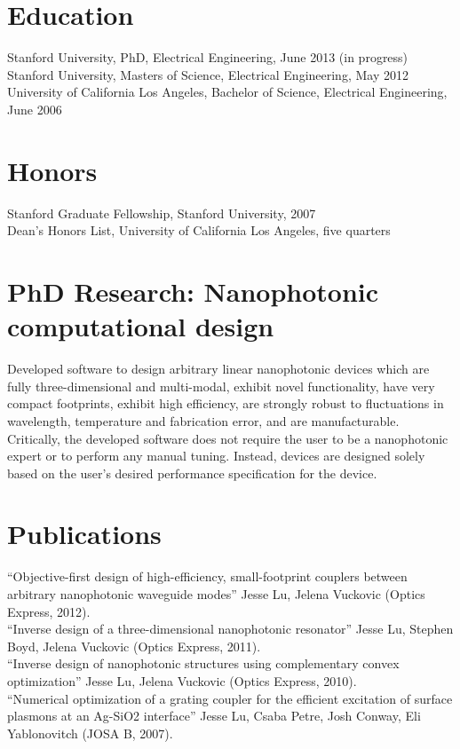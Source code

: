 \documentclass{res}
\begin{document}
 

\address{\texttt{jesselu@stanford.edu} \\ 66 Newell Rd. Apt. O \\ East Palo Alto, CA \\ (408) 568-9356}
                                  
\begin{resume}

\section{Education}          
    Stanford University, PhD, Electrical Engineering, June 2013 (in progress) \\
    Stanford University, Masters of Science, Electrical Engineering, May 2012 \\
    University of California Los Angeles, Bachelor of Science, Electrical Engineering, June 2006

\section{Honors}
    Stanford Graduate Fellowship, Stanford University, 2007 \\
    Dean's Honors List, University of California Los Angeles, five quarters

\section{PhD Research: Nanophotonic computational design}
Developed software to 
    design arbitrary linear nanophotonic devices which 
    are fully three-dimensional and multi-modal,
    exhibit novel functionality,
    have very compact footprints,
    exhibit high efficiency, 
    are strongly robust to fluctuations in 
    wavelength, temperature and fabrication error, and
    are manufacturable.
Critically, the developed software 
    does not require the user to be a nanophotonic expert or 
    to perform any manual tuning. 
Instead, devices are designed
    solely based on the user's desired performance specification for the device.

\section{Publications}          
    ``Objective-first design of high-efficiency, small-footprint couplers between arbitrary nanophotonic waveguide modes'' Jesse Lu, Jelena Vuckovic (Optics Express, 2012). \\
    ``Inverse design of a three-dimensional nanophotonic resonator'' Jesse Lu, Stephen Boyd, Jelena Vuckovic (Optics Express, 2011). \\
    ``Inverse design of nanophotonic structures using complementary convex optimization'' Jesse Lu, Jelena Vuckovic (Optics Express, 2010). \\
    ``Numerical optimization of a grating coupler for the efficient excitation of surface plasmons at an Ag-SiO2 interface'' Jesse Lu, Csaba Petre, Josh Conway, Eli Yablonovitch (JOSA B, 2007).
  

\end{resume}
\end{document}
